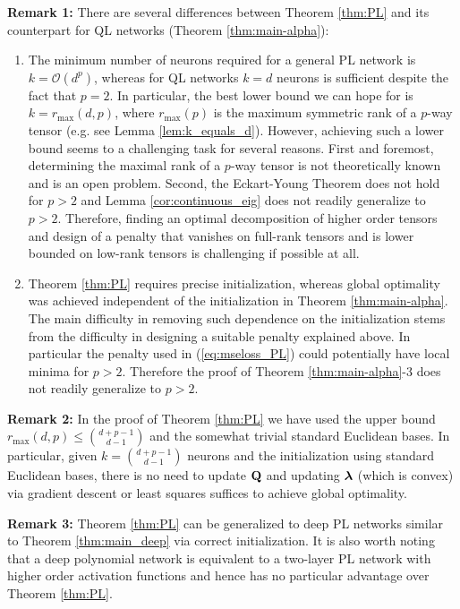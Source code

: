 \documentclass[11pt]{article}
\theoremstyle{plain}
\theoremstyle{plain}
\numberwithin{equation}{section}
\numberwithin{lemma}{section}
\numberwithin{theorem}{section}
\numberwithin{corollary}{section}
\numberwithin{observation}{section}
\numberwithin{definition}{section}
\numberwithin{example}{section}
\begin{document}
\textbf{Remark 1:} There are several differences between Theorem \ref{thm:PL} and its counterpart for QL networks (Theorem \ref{thm:main-alpha}):
\begin{enumerate}
    \item The minimum number of neurons required for a general PL network is $k = \mathcal{O}(d^p)$, whereas for QL networks $k = d$ neurons is sufficient despite the fact that $p = 2$. In particular, the best lower bound we can hope for is $k = r_{\max}(d,p)$, where $r_{\max}(p)$ is the maximum symmetric rank of a $p$-way tensor (e.g. see Lemma \ref{lem:k_equals_d}). However, achieving such a lower bound seems to a challenging task for several reasons. First and foremost, determining the maximal rank of a $p$-way tensor is not theoretically known and is an open problem. Second, the Eckart-Young Theorem does not hold for $p>2$ and Lemma \ref{cor:continuous_eig} does not readily generalize to $p>2$. Therefore, finding an optimal decomposition of higher order tensors and design of a penalty that vanishes on full-rank tensors and is lower bounded on low-rank tensors is challenging if possible at all.
    
    \item Theorem \ref{thm:PL} requires precise initialization, whereas global optimality was achieved independent of the initialization in Theorem \ref{thm:main-alpha}. The main difficulty in removing such dependence on the initialization stems from the difficulty in designing a suitable penalty explained above. In particular the penalty used in (\ref{eq:mseloss_PL}) could potentially have local minima for $p > 2$. Therefore the proof of Theorem \ref{thm:main-alpha}-3 does not readily generalize to $p > 2$.
\end{enumerate}

\textbf{Remark 2:} In the proof of Theorem \ref{thm:PL} we have used the upper bound $r_{\max}(d,p) \leq \binom{d+p-1}{d-1}$ and the somewhat trivial standard Euclidean bases. In particular, given $k= \binom{d+p-1}{d-1} $ neurons and the initialization using standard Euclidean bases, there is no need to update $\Mx{Q}$ and updating $\V{\lambda}$ (which is convex) via gradient descent or least squares suffices to achieve global optimality. 

\textbf{Remark 3:} Theorem \ref{thm:PL} can be generalized to deep PL networks similar to Theorem \ref{thm:main_deep} via correct initialization. It is also worth noting that a deep polynomial network is equivalent to a two-layer PL network with higher order activation functions and hence has no particular advantage over Theorem \ref{thm:PL}.




 
\end{document}
